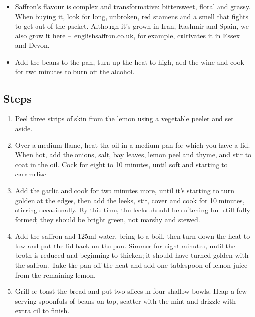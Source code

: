\documentclass{book}
\begin{document}
\begin{itemize}
\item Saffron’s flavour is complex and transformative: bittersweet, floral and grassy. When buying it, look for long, unbroken, red stamens and a smell that fights to get out of the packet. Although it’s grown in Iran, Kashmir and Spain, we also grow it here – englishsaffron.co.uk, for example, cultivates it in Essex and Devon. 
\end{itemize}

\begin{itemize}
\item Add the beans to the pan, turn up the heat to high, add the wine and cook for two minutes to burn off the alcohol.
\end{itemize}

\subsection*{Steps}
\begin{enumerate}
\item Peel three strips of skin from the lemon using a vegetable peeler and set aside.
\item Over a medium flame, heat the oil in a medium pan for which you have a lid. When hot, add the onions, salt, bay leaves, lemon peel and thyme, and stir to coat in the oil. Cook for eight to 10 minutes, until soft and starting to caramelise.
\item Add the garlic and cook for two minutes more, until it’s starting to turn golden at the edges, then add the leeks, stir, cover and cook for 10 minutes, stirring occasionally. By this time, the leeks should be softening but still fully formed; they should be bright green, not marshy and stewed.
\item Add the saffron and 125ml water, bring to a boil, then turn down the heat to low and put the lid back on the pan. Simmer for eight minutes, until the broth is reduced and beginning to thicken; it should have turned golden with the saffron. Take the pan off the heat and add one tablespoon of lemon juice from the remaining lemon.
\item Grill or toast the bread and put two slices in four shallow bowls. Heap a few serving spoonfuls of beans on top, scatter with the mint and drizzle with extra oil to finish.
\end{enumerate}
\newpage
\end{document}
